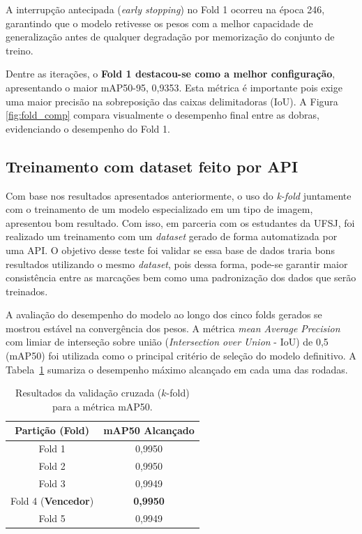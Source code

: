 \documentclass[12pt]{article}
\begin{document}
A interrupção antecipada (\textit{early stopping}) no Fold 1 ocorreu na época 246, garantindo que o modelo retivesse os pesos com a melhor capacidade de generalização antes de qualquer degradação por memorização do conjunto de treino.

Dentre as iterações, o \textbf{Fold 1 destacou-se como a melhor configuração}, apresentando o maior mAP50-95, 0,9353. Esta métrica é importante pois exige uma maior precisão na sobreposição das caixas delimitadoras (IoU). A Figura \ref{fig:fold_comp} compara visualmente o desempenho final entre as dobras, evidenciando o desempenho do Fold 1.

\subsection{Treinamento com dataset feito por API}

Com base nos resultados apresentados anteriormente, o uso do \textit{k-fold} juntamente com o treinamento de um modelo especializado em um tipo de imagem, apresentou bom resultado. Com isso, em parceria com os estudantes da UFSJ, foi realizado um treinamento com um \textit{dataset} gerado de forma automatizada por uma API. O objetivo desse teste foi validar se essa base de dados traria bons resultados utilizando o mesmo \textit{dataset}, pois dessa forma, pode-se garantir maior consistência entre as marcações bem como uma padronização dos dados que serão treinados.

A avaliação do desempenho do modelo ao longo dos cinco folds gerados se mostrou estável na convergência dos pesos. A métrica \textit{mean Average Precision} com limiar de interseção sobre união (\textit{Intersection over Union} - IoU) de 0,5 (mAP50) foi utilizada como o principal critério de seleção do modelo definitivo. A Tabela~\ref{tab:resultados_folds} sumariza o desempenho máximo alcançado em cada uma das rodadas.

\begin{table}[htbp]
\centering
\caption{Resultados da validação cruzada ($k$-fold) para a métrica mAP50.}
\label{tab:resultados_folds}
\begin{tabular}{cc}
\hline
\textbf{Partição (Fold)} & \textbf{mAP50 Alcançado} \\ \hline
Fold 1                   & 0,9950                   \\
Fold 2                   & 0,9950                   \\
Fold 3                   & 0,9949                   \\
Fold 4 (\textbf{Vencedor}) & \textbf{0,9950}          \\
Fold 5                   & 0,9949                   \\ \hline
\end{tabular}
\end{table}
\end{document}
